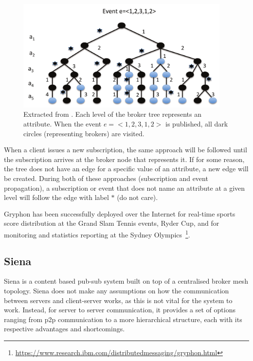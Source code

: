 \begin{figure}[hb!]
  \centering
  \includegraphics[width=0.95\textwidth]{../images/gryphon.png}
  \caption{Extracted from \cite{Kermarrec2013}. Each level of the broker tree represents an attribute.
  When the event $e = <1, 2, 3, 1, 2>$ is published,
  all dark circles (representing brokers) are visited.}
  \label{fig:gryphon}
\end{figure}

When a client issues a new subscription, the same approach will be
followed until the subscription arrives at the broker node that
represents it. If for some reason, the tree does not have an edge for a
specific value of an attribute, a new edge will be created. During both
of these approaches (subscription and event propagation), a subscription
or event that does not name an attribute at a given level will follow
the edge with label $*$ (do not care).

Gryphon has been successfully deployed over the Internet for real-time
sports score distribution at the Grand Slam Tennis events, Ryder Cup,
and for monitoring and statistics reporting at the Sydney Olympics~\footnote{\url{https://www.research.ibm.com/distributedmessaging/gryphon.html}}.

\subsection{Siena}\label{siena}

Siena \cite{Carzaniga2003} is a content based pub-sub system built
on top of a centralised broker mesh topology. Siena does not make any
assumptions on how the communication between servers and client-server
works, as this is not vital for the system to work. Instead, for server
to server communication, it provides a set of options ranging from \acrshort{p2p}
communication to a more hierarchical structure, each with its respective
advantages and shortcomings.

